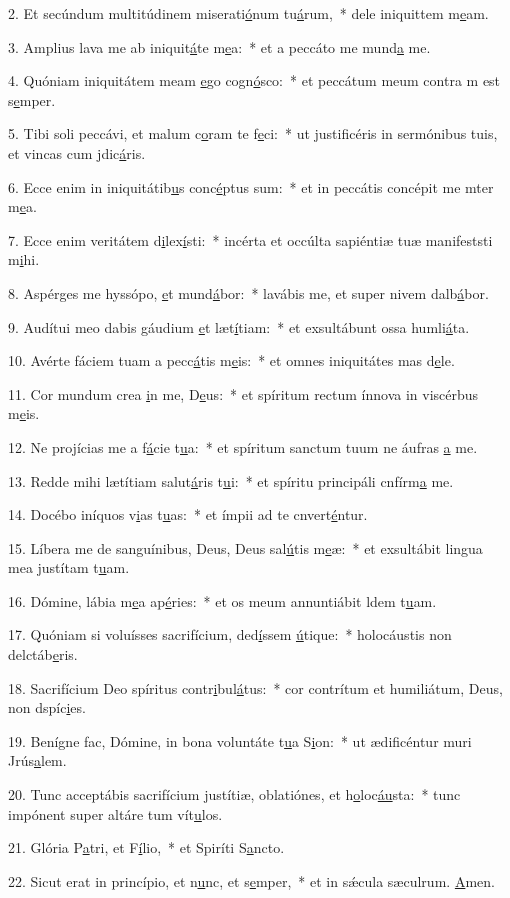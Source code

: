 2. Et secúndum multitúdinem miserati\uline{ó}num tu\uline{á}rum,~* dele iniquittem m\uline{e}am.\par 
3. Amplius lava me ab iniquit\uline{á}te m\uline{e}a:~* et a peccáto me mund\uline{a} me.\par 
4. Quóniam iniquitátem meam \uline{e}go cogn\uline{ó}sco:~* et peccátum meum contra m est s\uline{e}mper.\par 
5. Tibi soli peccávi, et malum c\uline{o}ram te f\uline{e}ci:~* ut justificéris in sermónibus tuis, et vincas cum jdic\uline{á}ris.\par 
6. Ecce enim in iniquitátib\uline{u}s conc\uline{é}ptus sum:~* et in peccátis concépit me mter m\uline{e}a.\par 
7. Ecce enim veritátem d\uline{i}lex\uline{í}sti:~* incérta et occúlta sapiéntiæ tuæ manifeststi m\uline{i}hi.\par 
8. Aspérges me hyssópo, \uline{e}t mund\uline{á}bor:~* lavábis me, et super nivem dalb\uline{á}bor.\par 
9. Audítui meo dabis gáudium \uline{e}t læt\uline{í}tiam:~* et exsultábunt ossa humli\uline{á}ta.\par 
10. Avérte fáciem tuam a pecc\uline{á}tis m\uline{e}is:~* et omnes iniquitátes mas d\uline{e}le.\par 
11. Cor mundum crea \uline{i}n me, D\uline{e}us:~* et spíritum rectum ínnova in viscérbus m\uline{e}is.\par 
12. Ne projícias me a f\uline{á}cie t\uline{u}a:~* et spíritum sanctum tuum ne áufras \uline{a} me.\par 
13. Redde mihi lætítiam salut\uline{á}ris t\uline{u}i:~* et spíritu principáli cnfírm\uline{a} me.\par 
14. Docébo iníquos v\uline{i}as t\uline{u}as:~* et ímpii ad te cnvert\uline{é}ntur.\par 
15. Líbera me de sanguínibus, Deus, Deus sal\uline{ú}tis m\uline{e}æ:~* et exsultábit lingua mea justítam t\uline{u}am.\par 
16. Dómine, lábia m\uline{e}a ap\uline{é}ries:~* et os meum annuntiábit ldem t\uline{u}am.\par 
17. Quóniam si voluísses sacrifícium, ded\uline{í}ssem \uline{ú}tique:~* holocáustis non delctáb\uline{e}ris.\par 
18. Sacrifícium Deo spíritus contr\uline{i}bul\uline{á}tus:~* cor contrítum et humiliátum, Deus, non dspíc\uline{i}es.\par 
19. Benígne fac, Dómine, in bona voluntáte t\uline{u}a S\uline{i}on:~* ut ædificéntur muri Jrús\uline{a}lem.\par 
20. Tunc acceptábis sacrifícium justítiæ, oblatiónes, et h\uline{o}loc\uline{áu}sta:~* tunc impónent super altáre tum vít\uline{u}los.\par 
21. Glória P\uline{a}tri, et F\uline{í}lio,~* et Spiríti S\uline{a}ncto.\par 
22. Sicut erat in princípio, et n\uline{u}nc, et s\uline{e}mper,~* et in sǽcula sæculrum. \uline{A}men.\par 
